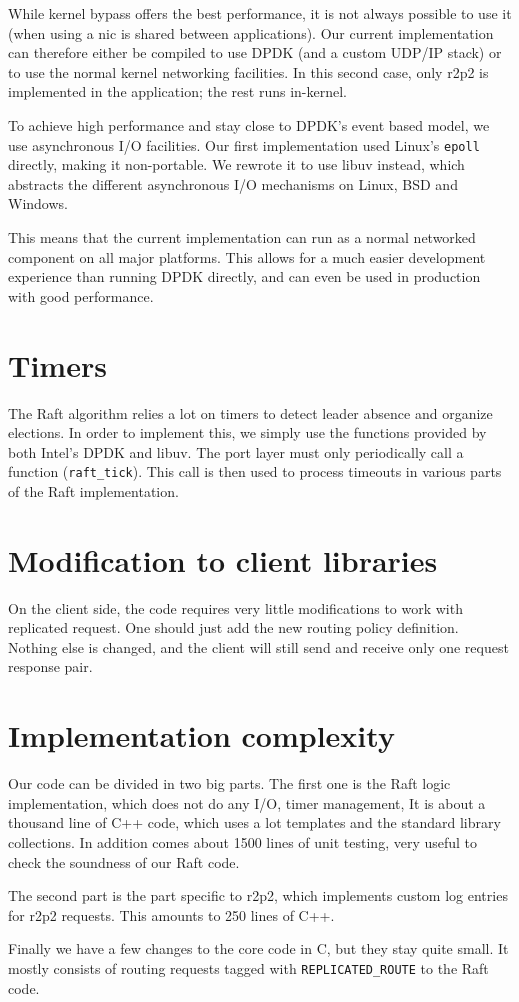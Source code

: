 While kernel bypass offers the best performance, it is not always possible to use it (\ie when using a \gls{nic} is shared between applications).
Our current implementation can therefore either be compiled to use DPDK (and a custom UDP/IP stack) or to use the normal kernel networking facilities.
In this second case, only \gls{r2p2} is implemented in the application; the rest runs in-kernel.

To achieve high performance and stay close to DPDK's event based model, we use asynchronous I/O facilities.
Our first implementation used Linux's \texttt{epoll} directly, making it non-portable.
We rewrote it to use libuv instead, which abstracts the different asynchronous I/O mechanisms on Linux, BSD and Windows.

This means that the current implementation can run as a normal networked component on all major platforms.
This allows for a much easier development experience than running DPDK directly, and can even be used in production with good performance.

\section{Timers}

The Raft algorithm relies a lot on timers to detect leader absence and organize elections.
In order to implement this, we simply use the functions provided by both Intel's DPDK and libuv.
The port layer must only periodically call a function (\texttt{raft\_tick}).
This call is then used to process timeouts in various parts of the Raft implementation.

\section{Modification to client libraries}

On the client side, the code requires very little modifications to work with replicated request.
One should just add the new routing policy definition.
Nothing else is changed, and the client will still send and receive only one request response pair.


\section{Implementation complexity}

Our code can be divided in two big parts.
The first one is the Raft logic implementation, which does not do any I/O, timer management, \etc
It is about a thousand line of C++ code, which uses a lot templates and the standard library collections.
In addition comes about 1500 lines of unit testing, very useful to check the soundness of our Raft code.

The second part is the part specific to \gls{r2p2}, which implements custom log entries for \gls{r2p2} requests.
This amounts to 250 lines of C++.

Finally we have a few changes to the core code in C, but they stay quite small.
It mostly consists of routing requests tagged with \texttt{REPLICATED\_ROUTE} to the Raft code.
